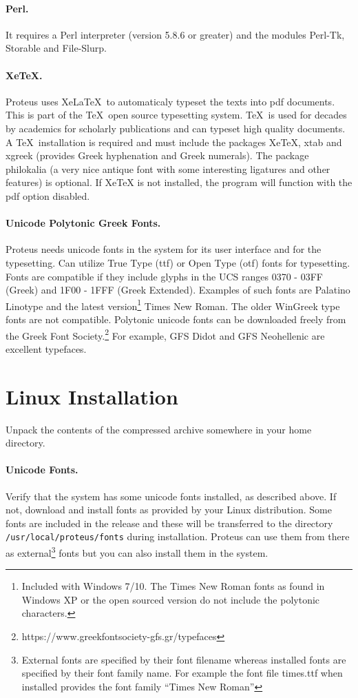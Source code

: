 \documentclass[11pt,a4paper]{article}
\begin{document}
  \paragraph{Perl.}
  It requires a Perl interpreter (version 5.8.6 or greater) and the
  modules Perl-Tk, Storable and File-Slurp.
  \paragraph{XeTeX.}
  Proteus uses XeLaTeX\ to automaticaly typeset the texts into pdf documents.
  This is part of the \TeX\ open source typesetting system. \TeX\ is used
  for decades by academics for scholarly publications and can typeset high
  quality documents. A \TeX\ installation is
  required and must include the packages XeTeX, xtab and xgreek
  (provides Greek hyphenation and Greek numerals). The package philokalia
  (a very nice antique font with some interesting ligatures and other features)
  is optional.  If XeTeX is not
  installed, the program will function with the pdf option disabled.
  \paragraph{Unicode Polytonic Greek Fonts.}
    Proteus needs unicode fonts in the system for its user interface
    and for the typesetting.
    Can utilize True Type (ttf) or Open Type (otf) fonts for typesetting.
    Fonts are compatible if they include glyphs in the UCS ranges
    0370 - 03FF (Greek) and 1F00 - 1FFF (Greek Extended).
    Examples of such fonts are Palatino Linotype and the latest version\footnote{
                Included with Windows 7/10.
                The Times New Roman fonts as found
                in Windows XP or the open sourced version do not include the
                 polytonic characters.}
    Times New Roman.  The older WinGreek type fonts are not compatible.
    Polytonic unicode fonts can be downloaded freely
    from the Greek Font Society.\footnote{
                https://www.greekfontsociety-gfs.gr/typefaces
                }
    For example, GFS Didot and GFS Neohellenic are excellent typefaces.
\section{Linux Installation}
    Unpack the contents of the compressed archive somewhere in your home directory.
    \paragraph{Unicode Fonts.}
      Verify that the system has some unicode fonts installed, as described above.
      If not, download and install fonts as provided by your Linux distribution.
      Some fonts are included in the release and these will be transferred to the directory
      {\tt /usr/local/proteus/fonts} during installation. Proteus can use them
      from there as external\footnote{External fonts are specified by their font
      filename whereas installed fonts are specified by their font family name.
    For example the font file times.ttf when installed provides the font family ``Times New Roman'' }
    fonts but you can also install them in the system.
\end{document}
